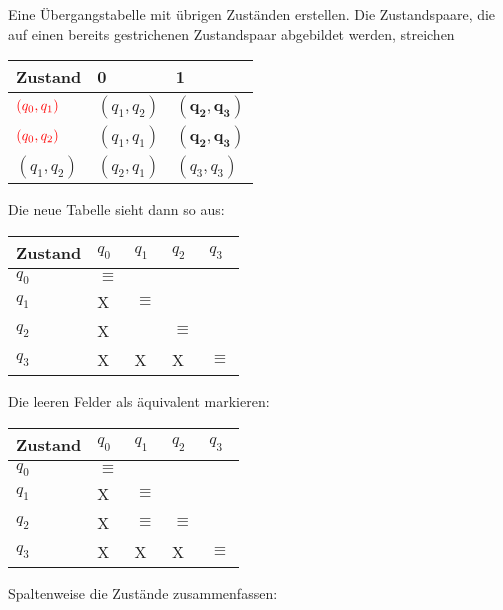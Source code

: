 \documentclass[12pt, oneside]{book}
\begin{document}
Eine Übergangstabelle mit übrigen Zuständen erstellen. Die Zustandspaare, die auf einen bereits gestrichenen Zustandspaar abgebildet werden, streichen
\begin{table}[H]
    \centering
    \begin{tabular}{|l|l|l|}
    \hline
    Zustand      & 0           & 1           \\ \hline
    $\color{red}(q_0,q_1)$  & $(q_1,q_2)$ & $\mathbf{(q_2,q_3)}$ \\ \hline
    $\color{red}(q_0,q_2)$  & $(q_1,q_1)$ & $\mathbf{(q_2,q_3)}$ \\ \hline
    $(q_1,q_2)$  & $(q_2,q_1)$ & $(q_3,q_3)$ \\ \hline
    \end{tabular}
\end{table}
Die neue Tabelle sieht dann so aus:
\begin{table}[H]
    \centering
    \begin{tabular}{|l|l|l|l|l|}
    \hline
    Zustand    & $q_0$    &     $q_1$       & $q_2$    & $q_3$    \\ \hline
    $q_0$      & $\equiv$ &                 &          &          \\ \hline
    $q_1$      &    X     &     $\equiv$    &          &          \\ \hline
    $q_2$      &    X     &                 & $\equiv$ &          \\ \hline
    $q_3$      &    X     &     X           &    X     & $\equiv$ \\ \hline
    \end{tabular}
\end{table}
Die leeren Felder als äquivalent markieren:
\begin{table}[H]
    \centering
    \begin{tabular}{|l|l|l|l|l|}
    \hline
    Zustand    & $q_0$    &     $q_1$       & $q_2$    & $q_3$    \\ \hline
    $q_0$      & $\equiv$ &                 &          &          \\ \hline
    $q_1$      &    X     &     $\equiv$    &          &          \\ \hline
    $q_2$      &    X     &     $\equiv$    & $\equiv$ &          \\ \hline
    $q_3$      &    X     &     X           &    X     & $\equiv$ \\ \hline
    \end{tabular}
\end{table}
Spaltenweise die Zustände zusammenfassen:
\begin{figure}[H]
    \centering
    \begin{transitiongraph}[fa]
    \end{transitiongraph}
\end{figure}
\newcommand{\enea}{$\epsilon$-NEA}
\newcommand{\ehu}{$\epsilon$\text{-Hülle}\ }
\end{document}
